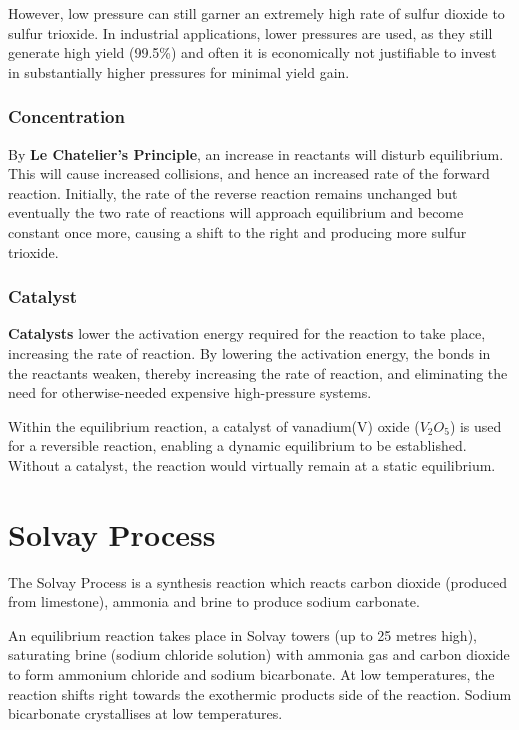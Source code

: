\documentclass[12pt, a4paper]{article}
\begin{document}
However, low pressure can still garner an extremely high rate of sulfur dioxide to sulfur trioxide. In industrial applications, lower pressures are used, as they still generate high yield (99.5\%) and often it is economically not justifiable to invest in substantially higher pressures for minimal yield gain.






\subsubsection{Concentration}

By \textbf{Le Chatelier's Principle}, an increase in reactants will disturb equilibrium. This will cause increased collisions, and hence an increased rate of the forward reaction. Initially, the rate of the reverse reaction remains unchanged but eventually the two rate of reactions will approach equilibrium and become constant once more, causing a shift to the right and producing more sulfur trioxide. 






\subsubsection{Catalyst}

\textbf{Catalysts} lower the activation energy required for the reaction to take place, increasing the rate of reaction. By lowering the activation energy, the bonds in the reactants weaken, thereby increasing the rate of reaction, and eliminating the need for otherwise-needed expensive high-pressure systems.

Within the equilibrium reaction, a catalyst of vanadium(V) oxide (\(V_{2}O_{5}\)) is used for a reversible reaction, enabling a dynamic equilibrium to be established. Without a catalyst, the reaction would virtually remain at a static equilibrium.






\section{Solvay Process}

The Solvay Process is a synthesis reaction which reacts carbon dioxide (produced from limestone), ammonia and brine to produce sodium carbonate. 

An equilibrium reaction takes place in Solvay towers (up to 25 metres high), saturating brine (sodium chloride solution) with ammonia gas and carbon dioxide to form ammonium chloride and sodium bicarbonate. At low temperatures, the reaction shifts right towards the exothermic products side of the reaction. Sodium bicarbonate crystallises at low temperatures.
\end{document}
